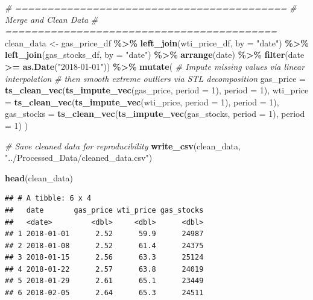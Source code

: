\documentclass[
]{article}
\newenvironment{Shaded}{\begin{snugshade}}{\end{snugshade}}
\newcommand{\AttributeTok}[1]{\textcolor[rgb]{0.13,0.29,0.53}{#1}}
\newcommand{\CommentTok}[1]{\textcolor[rgb]{0.56,0.35,0.01}{\textit{#1}}}
\newcommand{\DecValTok}[1]{\textcolor[rgb]{0.00,0.00,0.81}{#1}}
\newcommand{\FunctionTok}[1]{\textcolor[rgb]{0.13,0.29,0.53}{\textbf{#1}}}
\newcommand{\NormalTok}[1]{#1}
\newcommand{\OtherTok}[1]{\textcolor[rgb]{0.56,0.35,0.01}{#1}}
\newcommand{\SpecialCharTok}[1]{\textcolor[rgb]{0.81,0.36,0.00}{\textbf{#1}}}
\newcommand{\StringTok}[1]{\textcolor[rgb]{0.31,0.60,0.02}{#1}}
\begin{document}
\begin{Shaded}
\begin{Highlighting}[]
\CommentTok{\# ==========================================}
\CommentTok{\# Merge and Clean Data}
\CommentTok{\# ==========================================}
\NormalTok{clean\_data }\OtherTok{\textless{}{-}}\NormalTok{ gas\_price\_df }\SpecialCharTok{\%\textgreater{}\%}
  \FunctionTok{left\_join}\NormalTok{(wti\_price\_df, }\AttributeTok{by =} \StringTok{"date"}\NormalTok{) }\SpecialCharTok{\%\textgreater{}\%}
  \FunctionTok{left\_join}\NormalTok{(gas\_stocks\_df, }\AttributeTok{by =} \StringTok{"date"}\NormalTok{) }\SpecialCharTok{\%\textgreater{}\%}
  \FunctionTok{arrange}\NormalTok{(date) }\SpecialCharTok{\%\textgreater{}\%}
  \FunctionTok{filter}\NormalTok{(date }\SpecialCharTok{\textgreater{}=} \FunctionTok{as.Date}\NormalTok{(}\StringTok{"2018{-}01{-}01"}\NormalTok{)) }\SpecialCharTok{\%\textgreater{}\%}
  \FunctionTok{mutate}\NormalTok{(}
    \CommentTok{\# Impute missing values via linear interpolation}
    \CommentTok{\# then smooth extreme outliers via STL decomposition}
    \AttributeTok{gas\_price  =} \FunctionTok{ts\_clean\_vec}\NormalTok{(}\FunctionTok{ts\_impute\_vec}\NormalTok{(gas\_price,  }\AttributeTok{period =} \DecValTok{1}\NormalTok{), }\AttributeTok{period =} \DecValTok{1}\NormalTok{),}
    \AttributeTok{wti\_price  =} \FunctionTok{ts\_clean\_vec}\NormalTok{(}\FunctionTok{ts\_impute\_vec}\NormalTok{(wti\_price,  }\AttributeTok{period =} \DecValTok{1}\NormalTok{), }\AttributeTok{period =} \DecValTok{1}\NormalTok{),}
    \AttributeTok{gas\_stocks =} \FunctionTok{ts\_clean\_vec}\NormalTok{(}\FunctionTok{ts\_impute\_vec}\NormalTok{(gas\_stocks, }\AttributeTok{period =} \DecValTok{1}\NormalTok{), }\AttributeTok{period =} \DecValTok{1}\NormalTok{)}
\NormalTok{  )}

\CommentTok{\# Save cleaned data for reproducibility}
\FunctionTok{write\_csv}\NormalTok{(clean\_data, }\StringTok{"../Processed\_Data/cleaned\_data.csv"}\NormalTok{)}

\FunctionTok{head}\NormalTok{(clean\_data)}
\end{Highlighting}
\end{Shaded}

\begin{verbatim}
## # A tibble: 6 x 4
##   date       gas_price wti_price gas_stocks
##   <date>         <dbl>     <dbl>      <dbl>
## 1 2018-01-01      2.52      59.9      24987
## 2 2018-01-08      2.52      61.4      24375
## 3 2018-01-15      2.56      63.3      25124
## 4 2018-01-22      2.57      63.8      24019
## 5 2018-01-29      2.61      65.1      23449
## 6 2018-02-05      2.64      65.3      24511
\end{verbatim}
\end{document}
